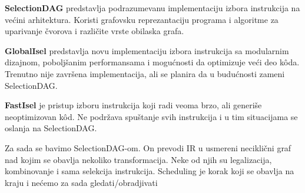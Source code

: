 \documentclass[12pt,oneside]{memoir}
\begin{document}
\textbf{SelectionDAG} predstavlja podrazumevanu implementaciju izbora instrukcija na većini arhitektura. Koristi grafovsku reprezantaciju programa i algoritme za uparivanje
čvorova i različite vrste obilaska grafa.

\textbf{GlobalIsel} predstavlja novu implementaciju izbora instrukcija sa modularnim dizajnom,
poboljšanim performansama i mogućnosti da optimizuje veći deo kôda. Trenutno nije završena implementacija, ali se planira da u budućnosti zameni
SelectionDAG.

\textbf{FastIsel} je pristup izboru instrukcija koji radi veoma brzo, ali generiše neoptimizovan kôd. Ne podržava spuštanje svih instrukcija i u tim situacijama se
oslanja na SelectionDAG.

Za sada se bavimo SelectionDAG-om. On prevodi IR u usmereni neciklični graf nad 
kojim se obavlja nekoliko transformacija. Neke od njih su legalizacija, 
kombinovanje i sama selekcija instrukcija. Scheduling je korak koji se obavlja na 
kraju i nećemo za sada gledati/obradjivati
\end{document}
